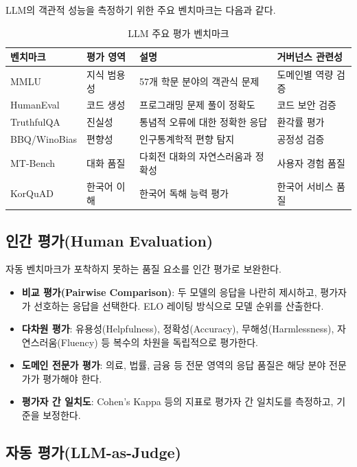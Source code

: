 LLM의 객관적 성능을 측정하기 위한 주요 벤치마크는 다음과 같다.

\begin{table}[htbp]
\centering
\caption{LLM 주요 평가 벤치마크}
\label{tab:llm_benchmarks}
\begin{tabularx}{\textwidth}{p{2.5cm}p{3cm}Xp{2.5cm}}
\toprule
\textbf{벤치마크} & \textbf{평가 영역} & \textbf{설명} & \textbf{거버넌스 관련성} \\
\midrule
MMLU & 지식 범용성 & 57개 학문 분야의 객관식 문제 & 도메인별 역량 검증 \\
HumanEval & 코드 생성 & 프로그래밍 문제 풀이 정확도 & 코드 보안 검증 \\
TruthfulQA & 진실성 & 통념적 오류에 대한 정확한 응답 & 환각률 평가 \\
BBQ/WinoBias & 편향성 & 인구통계학적 편향 탐지 & 공정성 검증 \\
MT-Bench & 대화 품질 & 다회전 대화의 자연스러움과 정확성 & 사용자 경험 품질 \\
KorQuAD & 한국어 이해 & 한국어 독해 능력 평가 & 한국어 서비스 품질 \\
\bottomrule
\end{tabularx}
\end{table}

\subsection{인간 평가(Human Evaluation)}

자동 벤치마크가 포착하지 못하는 품질 요소를 인간 평가로 보완한다.

\begin{itemize}
 \item \textbf{비교 평가(Pairwise Comparison)}: 두 모델의 응답을 나란히 제시하고, 평가자가 선호하는 응답을 선택한다. ELO 레이팅 방식으로 모델 순위를 산출한다.
 \item \textbf{다차원 평가}: 유용성(Helpfulness), 정확성(Accuracy), 무해성(Harmlessness), 자연스러움(Fluency) 등 복수의 차원을 독립적으로 평가한다.
 \item \textbf{도메인 전문가 평가}: 의료, 법률, 금융 등 전문 영역의 응답 품질은 해당 분야 전문가가 평가해야 한다.
 \item \textbf{평가자 간 일치도}: Cohen's Kappa 등의 지표로 평가자 간 일치도를 측정하고, 기준을 보정한다.
\end{itemize}

\subsection{자동 평가(LLM-as-Judge)}

